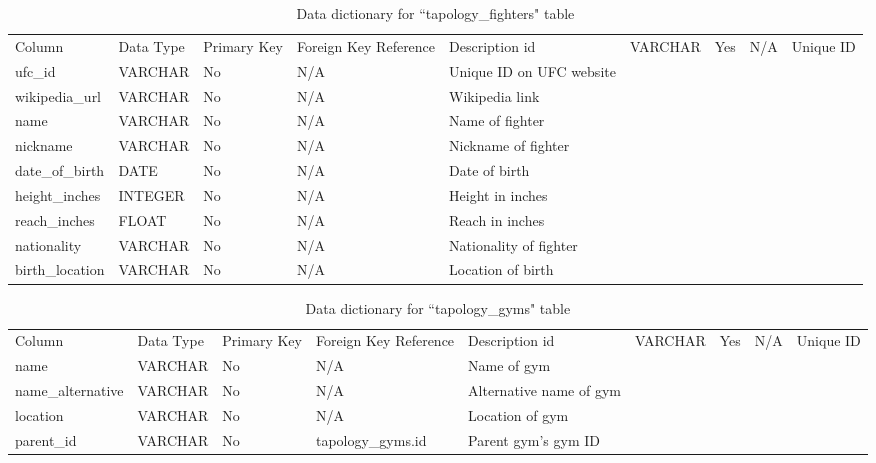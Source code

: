 \documentclass[12pt,twoside]{report}
\begin{document}
\tiny 
\begin{longtable}{lllll}
\caption{Data dictionary for ``tapology\_fighters" table}\\ 
\toprule
Column          & Data Type & Primary Key & Foreign Key Reference & Description               \endfirsthead 
\toprule
id              & VARCHAR   & Yes         & N/A                   & Unique ID                 \\
ufc\_id         & VARCHAR   & No          & N/A                   & Unique ID on UFC website  \\
wikipedia\_url  & VARCHAR   & No          & N/A                   & Wikipedia link            \\
name            & VARCHAR   & No          & N/A                   & Name of fighter           \\
nickname        & VARCHAR   & No          & N/A                   & Nickname of fighter       \\
date\_of\_birth & DATE      & No          & N/A                   & Date of birth             \\
height\_inches  & INTEGER   & No          & N/A                   & Height in inches          \\
reach\_inches   & FLOAT     & No          & N/A                   & Reach in inches           \\
nationality     & VARCHAR   & No          & N/A                   & Nationality of fighter    \\
birth\_location & VARCHAR   & No          & N/A                   & Location of birth         \\
\bottomrule
\end{longtable}
\normalsize

\tiny 
\begin{longtable}{lllll}
\caption{Data dictionary for ``tapology\_gyms" table}\\ 
\toprule
Column            & Data Type & Primary Key & Foreign Key Reference & Description              \endfirsthead 
\toprule
id                & VARCHAR   & Yes         & N/A                   & Unique ID                \\
name              & VARCHAR   & No          & N/A                   & Name of gym              \\
name\_alternative & VARCHAR   & No          & N/A                   & Alternative name of gym  \\
location          & VARCHAR   & No          & N/A                   & Location of gym          \\
parent\_id        & VARCHAR   & No          & tapology\_gyms.id     & Parent gym's gym ID      \\
\bottomrule
\end{longtable}
\normalsize
\end{document}
